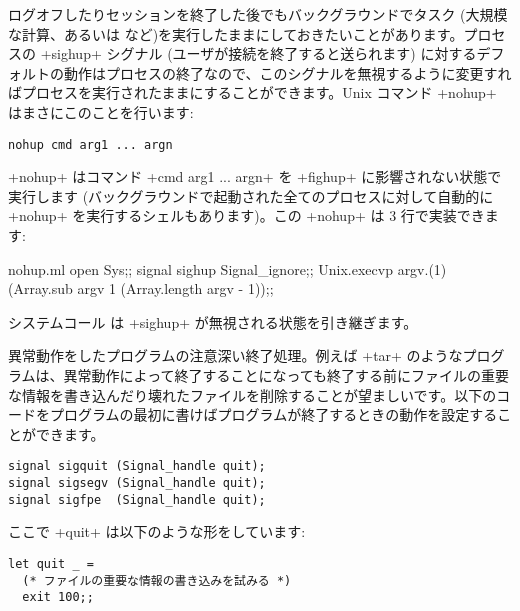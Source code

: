 \begin{example}
ログオフしたりセッションを終了した後でもバックグラウンドでタスク (大規模な計算、あるいは  など)を実行したままにしておきたいことがあります。プロセスの \ml+sighup+ シグナル (ユーザが接続を終了すると送られます) に対するデフォルトの動作はプロセスの終了なので、このシグナルを無視するように変更すればプロセスを実行されたままにすることができます。Unix コマンド \ml+nohup+ はまさにこのことを行います:
\begin{lstlisting}
nohup cmd arg1 ... argn
\end{lstlisting}
\ml+nohup+ はコマンド \ml+cmd arg1 ... argn+ を \ml+fighup+ に影響されない状態で実行します (バックグラウンドで起動された全てのプロセスに対して自動的に \ml+nohup+ を実行するシェルもあります)。この \ml+nohup+ は 3 行で実装できます:
%
\begin{listingcodefile}{nohup.ml}
open Sys;;
signal sighup Signal_ignore;;
Unix.execvp argv.(1) (Array.sub argv 1 (Array.length argv - 1));;
\end{listingcodefile}
%
システムコール  は \ml+sighup+ が無視される状態を引き継ぎます。
\end{example}

\begin{example}
異常動作をしたプログラムの注意深い終了処理。例えば \ml+tar+ のようなプログラムは、異常動作によって終了することになっても終了する前にファイルの重要な情報を書き込んだり壊れたファイルを削除することが望ましいです。以下のコードをプログラムの最初に書けばプログラムが終了するときの動作を設定することができます。
%
\begin{lstlisting}
signal sigquit (Signal_handle quit);
signal sigsegv (Signal_handle quit);
signal sigfpe  (Signal_handle quit);
\end{lstlisting}
%
ここで \ml+quit+ は以下のような形をしています:
%
\begin{lstlisting}
let quit _ =
  (* ファイルの重要な情報の書き込みを試みる *)
  exit 100;;
\end{lstlisting}
\end{example}

